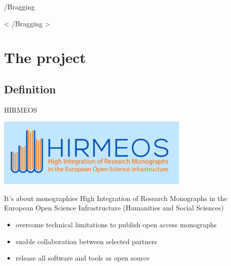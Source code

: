 \documentclass[xcolor=svgnames]{beamer}
\begin{document}
        \begin{frame}{/Bragging}
            \begin{center}
                \Huge{< /Bragging >}
            \end{center}
        \end{frame}

\section{The project}

    \subsection{Definition}

        \begin{frame}{HIRMEOS}
            \begin{center}
                \includegraphics[width=0.7\textwidth]{img/hirmeos}
                \color{black}
                \begin{block}{It's about monographies}
                    High Integration of Research Monographs in the European Open Science Infrastructure (Humanities and Social Sciences)
                \end{block}

                \pause

                \begin{itemize}
                    \item overcome technical limitations to publish open access monographs
                    \pause
                    \item enable collaboration between selected partners
                    \pause
                    \item release all software and tools as open source
                \end{itemize}
            \end{center}
        \end{frame}
\end{document}
